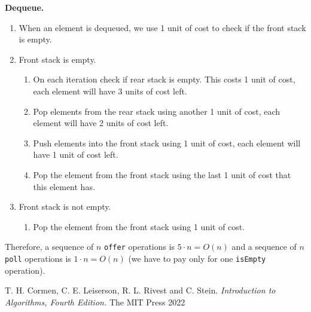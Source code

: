 \documentclass{article}
\begin{document}
\begin{enumerate}
    \textbf{Dequeue.} 
    \begin{enumerate}
        \item When an element is dequeued, we use 1 unit of cost to check if the front stack is empty.
        \item Front stack is empty.
        \begin{enumerate}
            \item On each iteration check if rear stack is empty. This costs 1 unit of cost, each element will have 3 units of cost left. 
            \item Pop elements from the rear stack using another 1 unit of cost, each element will have 2 units of cost left.
            \item Push elements into the front stack using 1 unit of cost, each element will have 1 unit of cost left.
            \item Pop the element from the front stack using the last 1 unit of cost that this element has.
        \end{enumerate}
        \item Front stack is not empty. 
        \begin{enumerate}
            \item Pop the element from the front stack using 1 unit of cost.
        \end{enumerate}
    \end{enumerate}

    Therefore, a sequence of $n$ \texttt{offer} operations is $5 \cdot n = O(n)$ and a sequence of $n$ \texttt{poll} operations is $1 \cdot n = O(n)$ (we have to pay only for one \texttt{isEmpty} operation).

\end{enumerate}

\begin{thebibliography}{9}
  T. H. Cormen, C. E. Leiserson, R. L. Rivest and C. Stein.
  \textit{Introduction to Algorithms, Fourth Edition.}
  The MIT Press
  2022
\end{thebibliography}
\end{document}
